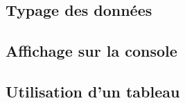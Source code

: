 \documentclass[a4paper,11pt,titlepage]{article} %
\begin{document}
\subsection*{Typage des données}

\subsection*{Affichage sur la console}

\subsection*{Utilisation d'un tableau}



\newpage

\end{document}
